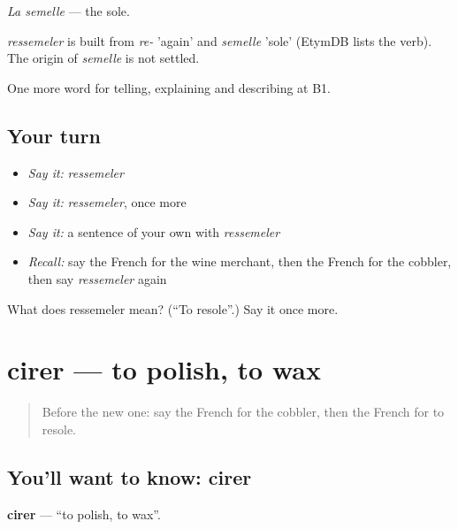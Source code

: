 \emph{La semelle} — the sole.

\begin{cousinweb}
\emph{ressemeler} is built from \emph{re-} 'again' and \emph{semelle} 'sole' (EtymDB lists the verb). The origin of \emph{semelle} is not settled.
\end{cousinweb}

\begin{grammarlens}[title={What you've built}]
One more word for telling, explaining and describing at B1.
\end{grammarlens}

\subsection*{Your turn}
\begin{itemize}
\raggedright
  \item \emph{Say it:} \emph{ressemeler}
  \item \emph{Say it:} \emph{ressemeler}, once more
  \item \emph{Say it:} a sentence of your own with \emph{ressemeler}
  \item \emph{Recall:} say the French for the wine merchant, then the French for the cobbler, then say \emph{ressemeler} again
\end{itemize}

\begin{tcolorbox}[breakable,colback=teal!4,colframe=teal!35!black,title={Before you move on}]
What does ressemeler mean? (\textquotedblleft{}To resole\textquotedblright{}.) Say it once more.
\end{tcolorbox}
\section[cirer]{cirer — to polish, to wax}

\label{lesson:FR-C446-cirer}



\begin{quote}
Before the new one: say the French for the cobbler, then the French for to resole.
\end{quote}

\subsection*{You'll want to know: cirer}
\textbf{cirer} — \textquotedblleft{}to polish, to wax\textquotedblright{}.

